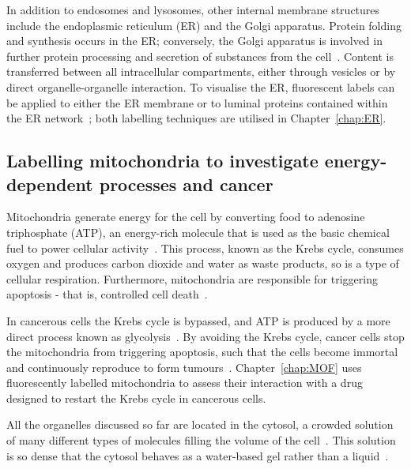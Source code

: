 In addition to endosomes and lysosomes, other internal membrane structures include the endoplasmic reticulum (ER) and the Golgi apparatus. 
Protein folding and synthesis occurs in the ER; conversely, the Golgi apparatus is involved in further protein processing and secretion of substances from the cell~\cite{dyson1978cell}. 
Content is transferred between all intracellular compartments, either through vesicles or by direct organelle-organelle interaction. 
To visualise the ER, fluorescent labels can be applied to either the ER membrane or to luminal proteins contained within the ER network~\cite{costantini2013probing}; both labelling techniques are utilised in Chapter~\ref{chap:ER}.  

\newpage
\subsection{Labelling mitochondria to investigate energy-dependent processes and cancer}
Mitochondria generate energy for the cell by converting food to adenosine triphosphate (ATP), an energy-rich molecule that is used as the basic chemical fuel to power cellular activity~\cite{alberts2013essential}. 
This process, known as the Krebs cycle, consumes oxygen and produces carbon dioxide and water as waste products, so is a type of cellular respiration. 
Furthermore, mitochondria are responsible for triggering apoptosis - that is, controlled cell death~\cite{murray1993cell}. 

In cancerous cells the Krebs cycle is bypassed, and ATP is produced by a more direct process known as glycolysis~\cite{warburg1930uber}. 
By avoiding the Krebs cycle, cancer cells stop the mitochondria from triggering apoptosis, such that the cells become immortal and continuously
 reproduce to form tumours~\cite{murray1993cell}. 
Chapter~\ref{chap:MOF} uses fluorescently labelled  mitochondria to assess their interaction with a drug designed to restart the Krebs cycle in cancerous cells. 

All the organelles discussed so far are located in the cytosol, a crowded solution of many different types of molecules filling the volume of the cell~\cite{goodsell1991inside}. 
This solution is so dense that the cytosol behaves as a water-based gel rather than a liquid~\cite{alberts2013essential}. 

